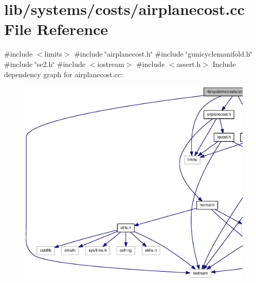 \section{lib/systems/costs/airplanecost.cc \-File \-Reference}
\label{airplanecost_8cc}
{\ttfamily \#include $<$limits$>$}\*
{\ttfamily \#include \char`\"{}airplanecost.\-h\char`\"{}}\*
{\ttfamily \#include \char`\"{}gunicyclemanifold.\-h\char`\"{}}\*
{\ttfamily \#include \char`\"{}se2.\-h\char`\"{}}\*
{\ttfamily \#include $<$iostream$>$}\*
{\ttfamily \#include $<$assert.\-h$>$}\*
\-Include dependency graph for airplanecost.\-cc\-:\nopagebreak
\begin{figure}[H]
\begin{center}
\leavevmode
\includegraphics[width=350pt]{airplanecost_8cc__incl}
\end{center}
\end{figure}
